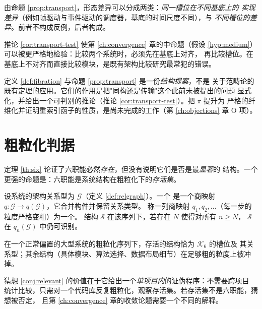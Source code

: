 \begin{corollary}[一个可观测的判别]\label{cor:transport-test}
由命题 \ref{prop:transport}，形态差异可以分成两类：\emph{同一槽位在不同基底上的
实现差异}（例如帧驱动与事件驱动的调度器，基底的时间尺度不同），与
\emph{不同槽位的差异}。前者不构成反例，后者构成。
\end{corollary}

推论 \ref{cor:transport-test} 使第 \ref{ch:convergence} 章的中命题（假设
\ref{hyp:medium}）可以被更严格地检验：比较两个系统时，必须先在基底上对齐，
再比较槽位。在基底上不对齐而直接比较模块，是既有架构比较研究最常犯的错误。

\begin{remark}[这一节的地位]\label{rmk:fibration-status}
定义 \ref{def:fibration} 与命题 \ref{prop:transport} 是一份\emph{结构提案}，不是
关于范畴论的既有定理的应用。它们的作用是把"同构还是传输"这个此前未被提出的问题
显式化，并给出一个可判别的推论（推论 \ref{cor:transport-test}）。把 $\pi$ 提升为
严格的纤维化并证明重索引函子的性质，是尚未完成的工作（第 \ref{ch:objections} 章
O 项）。
\end{remark}

\section{粗粒化判据}\label{sec:coarsegrain}

定理 \ref{th:six} 论证了六职能必然\emph{存在}，但没有说明它们是否是最\emph{显著}的
结构。一个更强的命题是：六职能是系统结构在粗粒化下的\emph{存活集}。

\begin{definition}[粗粒化序列]\label{def:coarsegrain}
设系统的架构关系型为 $\mathcal{G}$（定义 \ref{def:relgraph}）。一个
是一个商映射 $q : \mathcal{G} \to q(\mathcal{G})$，它合并构件并保留关系类型。
称一列商映射 $q_1, q_2, \dots$（每一步的粒度严格变粗）为一个。
结构 $\mathcal{S}$ 在该序列下，若存在 $N$ 使得对所有 $n \ge N$，
$\mathcal{S}$ 在 $q_n(\mathcal{G})$ 中仍可识别。
\end{definition}

\begin{conjecture}[六职能是相关结构]\label{conj:relevant}
在一个正常偏置的大型系统的粗粒化序列下，存活的结构恰为 $\mathcal{K}_6$ 的槽位及
其关系型；其余结构（具体模块、算法选择、数据布局细节）在足够粗的粒度上被冲掉。
\end{conjecture}

猜想 \ref{conj:relevant} 的价值在于它给出一个\emph{单项目内}的证伪程序：不需要跨项目
统计比较，只需对一个代码库反复粗粒化，观察存活集。若存活集不是六职能，猜想被否定，
且第 \ref{ch:convergence} 章的收敛论题需要一个不同的解释。

